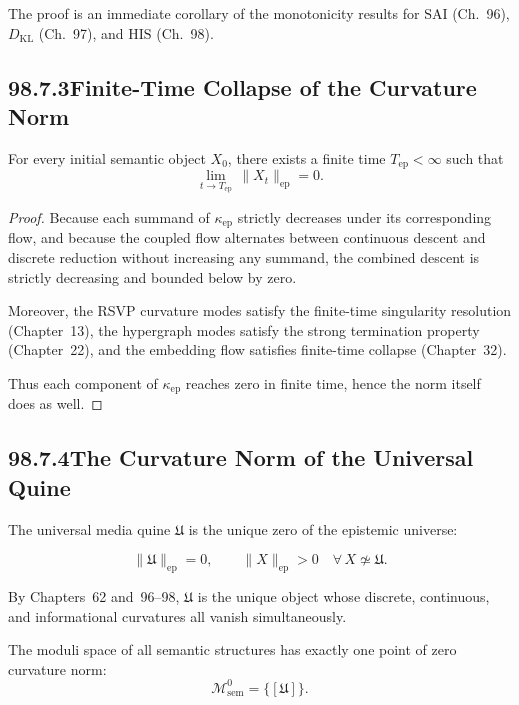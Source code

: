 The proof is an immediate corollary of the monotonicity results for
$\mathrm{SAI}$ (Ch.~96),
$D_{\mathrm{KL}}$ (Ch.~97),
and $\mathrm{HIS}$ (Ch.~98).

\subsection*{98.7.3\quad Finite-Time Collapse of the Curvature Norm}

\begin{theorem}
For every initial semantic object $X_0$, there exists a finite time
$T_{\mathrm{ep}}<\infty$ such that
\[
\lim_{t\to T_{\mathrm{ep}}}\,\|X_t\|_{\mathrm{ep}} = 0.
\]
\end{theorem}

\begin{proof}
Because each summand of $\kappa_{\mathrm{ep}}$
strictly decreases under its corresponding flow,
and because the coupled flow alternates between continuous descent
and discrete reduction without increasing any summand,
the combined descent is strictly decreasing and bounded below by zero.

Moreover, the RSVP curvature modes satisfy the finite-time
singularity resolution (Chapter~13),
the hypergraph modes satisfy the strong termination property (Chapter~22),
and the embedding flow satisfies finite-time collapse (Chapter~32).

Thus each component of $\kappa_{\mathrm{ep}}$
reaches zero in finite time,
hence the norm itself does as well.
\end{proof}

\subsection*{98.7.4\quad The Curvature Norm of the Universal Quine}

The universal media quine $\mathfrak{U}$ is the unique zero of
the epistemic universe:

\[
\|\mathfrak{U}\|_{\mathrm{ep}} = 0,
\qquad
\|X\|_{\mathrm{ep}}>0\quad\forall\,X\not\simeq\mathfrak{U}.
\]

By Chapters~62 and~96–98,
$\mathfrak{U}$ is the unique object whose discrete, continuous,
and informational curvatures all vanish simultaneously.

\begin{theorem}
The moduli space of all semantic structures
has exactly one point of zero curvature norm:
\[
\mathcal{M}_{\mathrm{sem}}^{0} = \{[\mathfrak{U}]\}.
\]
\end{theorem}


